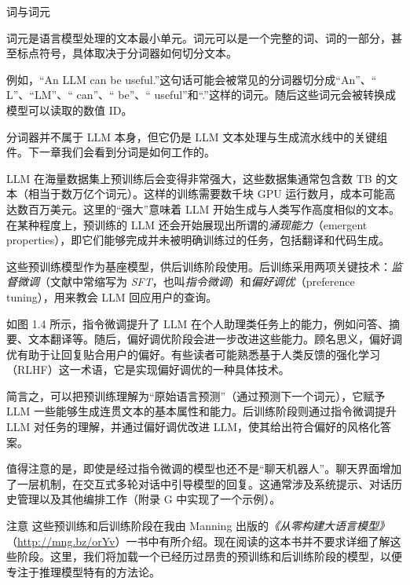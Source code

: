 \begin{mySidebar}{词与词元}

词元是语言模型处理的文本最小单元。词元可以是一个完整的词、词的一部分，甚至标点符号，具体取决于分词器如何切分文本。

例如，“An LLM can be useful.”这句话可能会被常见的分词器切分成“An”、“ L”、“LM”、“ can”、“ be”、“ useful”和“.”这样的词元。随后这些词元会被转换成模型可以读取的数值 ID。

分词器并不属于 LLM 本身，但它仍是 LLM 文本处理与生成流水线中的关键组件。下一章我们会看到分词是如何工作的。

\end{mySidebar}

LLM 在海量数据集上预训练后会变得非常强大，这些数据集通常包含数 TB 的文本（相当于数万亿个词元）。这样的训练需要数千块 GPU 运行数月，成本可能高达数百万美元。这里的“强大”意味着 LLM 开始生成与人类写作高度相似的文本。在某种程度上，预训练的 LLM 还会开始展现出所谓的\emph{涌现能力}（emergent properties），即它们能够完成并未被明确训练过的任务，包括翻译和代码生成。

这些预训练模型作为基座模型，供后训练阶段使用。后训练采用两项关键技术：\emph{监督微调}（文献中常缩写为 \emph{SFT}，也叫\emph{指令微调}）和\emph{偏好调优}（preference tuning），用来教会 LLM 回应用户的查询。

如图 1.4 所示，指令微调提升了 LLM 在个人助理类任务上的能力，例如问答、摘要、文本翻译等。随后，偏好调优阶段会进一步改进这些能力。顾名思义，偏好调优有助于让回复贴合用户的偏好。有些读者可能熟悉基于人类反馈的强化学习（RLHF）这一术语，它是实现偏好调优的一种具体技术。


简言之，可以把预训练理解为“原始语言预测”（通过预测下一个词元），它赋予 LLM 一些能够生成连贯文本的基本属性和能力。后训练阶段则通过指令微调提升 LLM 对任务的理解，并通过偏好调优改进 LLM，使其给出符合偏好的风格化答案。

值得注意的是，即使是经过指令微调的模型也还不是“聊天机器人”。聊天界面增加了一层机制，在交互式多轮对话中引导模型的回复。这通常涉及系统提示、对话历史管理以及其他编排工作（附录 G 中实现了一个示例）。

\begin{myWarning}{注意}
 这些预训练和后训练阶段在我由 Manning 出版的\emph{《从零构建大语言模型》}（\href{http://mng.bz/orYv}{http://mng.bz/orYv}）一书中有所介绍。现在阅读的这本书并不要求详细了解这些阶段。这里，我们将加载一个已经历过昂贵的预训练和后训练阶段的模型，以便专注于推理模型特有的方法论。\end{myWarning}

